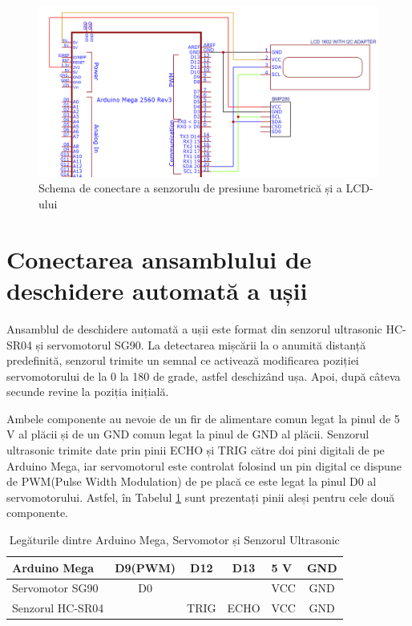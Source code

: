 \begin{figure}[H]
\includegraphics[width=1\textwidth, height=0.5\textwidth]{bachelors_ro/images/conexiune_bmp_lcd.png}
\caption{Schema de conectare a senzorulu de presiune barometrică și a LCD-ului}
\label{fig:conexiune_bmp_lcd}
\end{figure}

\section{Conectarea ansamblului de deschidere automată a ușii}
Ansamblul de deschidere automată a ușii este format din senzorul ultrasonic HC-SR04 și servomotorul SG90. La detectarea mișcării la o anumită distanță predefinită, senzorul trimite un semnal ce activează modificarea poziției servomotorului de la 0 la 180 de grade, astfel deschizând ușa. Apoi, după câteva secunde revine la poziția inițială.

Ambele componente au nevoie de un fir de alimentare comun legat la pinul de 5 V al plăcii și de un GND comun legat la pinul de GND al plăcii. Senzorul ultrasonic trimite date prin pinii ECHO și TRIG către doi pini digitali de pe Arduino Mega, iar servomotorul este controlat folosind un pin digital ce dispune de PWM(Pulse Width Modulation) de pe placă ce este legat la pinul D0 al servomotorului. Astfel, în Tabelul \ref{tab:conexiune_mega_hcsr04_servo} sunt prezentați pinii aleși pentru cele două componente.

\begin{table}[H]
\caption{Legăturile dintre Arduino Mega, Servomotor și Senzorul Ultrasonic}
\label{tab:conexiune_mega_hcsr04_servo}
\begin{tabular}{|l|c|c|c|l|c|}
\hline
Arduino Mega & D9(PWM) & D12 & D13 & 5 V & GND \\ \hline
Servomotor SG90 & D0 & & & VCC & GND \\ \hline
Senzorul HC-SR04 & & TRIG & ECHO & VCC & GND \\ \hline
\end{tabular}

\end{table}

